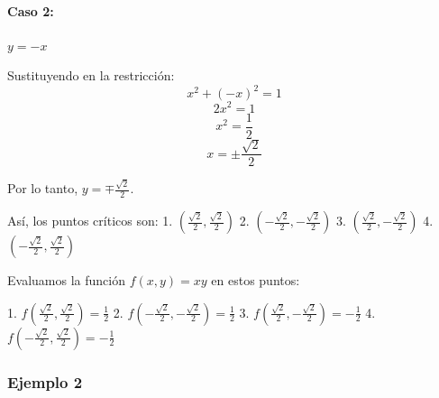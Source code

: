 \documentclass[11pt]{book}
\newcounter{cuent}
\theoremstyle{definicion}
\theoremstyle{teorema}
\theoremstyle{ejemplo}
\begin{document}
\paragraph{Caso 2:} \( y = -x \)

Sustituyendo en la restricción:
\[ x^2 + (-x)^2 = 1 \]
\[ 2x^2 = 1 \]
\[ x^2 = \frac{1}{2} \]
\[ x = \pm \frac{\sqrt{2}}{2} \]

Por lo tanto, \( y = \mp \frac{\sqrt{2}}{2} \).

Así, los puntos críticos son:
1. \( \left( \frac{\sqrt{2}}{2}, \frac{\sqrt{2}}{2} \right) \)
2. \( \left( -\frac{\sqrt{2}}{2}, -\frac{\sqrt{2}}{2} \right) \)
3. \( \left( \frac{\sqrt{2}}{2}, -\frac{\sqrt{2}}{2} \right) \)
4. \( \left( -\frac{\sqrt{2}}{2}, \frac{\sqrt{2}}{2} \right) \)

Evaluamos la función \( f(x, y) = xy \) en estos puntos:

1. \( f\left( \frac{\sqrt{2}}{2}, \frac{\sqrt{2}}{2} \right) = \frac{1}{2} \)
2. \( f\left( -\frac{\sqrt{2}}{2}, -\frac{\sqrt{2}}{2} \right) = \frac{1}{2} \)
3. \( f\left( \frac{\sqrt{2}}{2}, -\frac{\sqrt{2}}{2} \right) = -\frac{1}{2} \)
4. \( f\left( -\frac{\sqrt{2}}{2}, \frac{\sqrt{2}}{2} \right) = -\frac{1}{2} \)





\subsubsection{Ejemplo 2}

\end{document}
